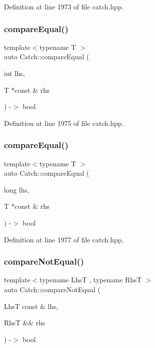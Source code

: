Definition at line 1973 of file catch.\+hpp.

\mbox{\label{namespace_catch_a6af99378569fc6f68270b6af669f1c3b}} 
\subsubsection{compareEqual()\hspace{0.1cm}{\footnotesize\ttfamily [4/5]}}
{\footnotesize\ttfamily template$<$typename T $>$ \\
auto Catch\+::compare\+Equal (\begin{DoxyParamCaption}\item[{int}]{lhs,  }\item[{T $\ast$const \&}]{rhs }\end{DoxyParamCaption}) -\/$>$ bool }



Definition at line 1975 of file catch.\+hpp.

\mbox{\label{namespace_catch_a72f10ec2cad6db16029d48c8c1d9df2f}} 
\subsubsection{compareEqual()\hspace{0.1cm}{\footnotesize\ttfamily [5/5]}}
{\footnotesize\ttfamily template$<$typename T $>$ \\
auto Catch\+::compare\+Equal (\begin{DoxyParamCaption}\item[{long}]{lhs,  }\item[{T $\ast$const \&}]{rhs }\end{DoxyParamCaption}) -\/$>$ bool }



Definition at line 1977 of file catch.\+hpp.

\mbox{\label{namespace_catch_a8bec217f5ef5f09c17074c311c958f3c}} 
\subsubsection{compareNotEqual()\hspace{0.1cm}{\footnotesize\ttfamily [1/5]}}
{\footnotesize\ttfamily template$<$typename LhsT , typename RhsT $>$ \\
auto Catch\+::compare\+Not\+Equal (\begin{DoxyParamCaption}\item[{LhsT const \&}]{lhs,  }\item[{RhsT \&\&}]{rhs }\end{DoxyParamCaption}) -\/$>$ bool }




